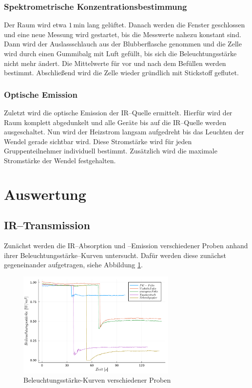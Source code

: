 \documentclass[12pt,a4paper]{scrartcl}
\numberwithin{equation}{section} %
\begin{document}
\subsubsection{Spektrometrische Konzentrationsbestimmung}
\label{howto:Spektrometrische Konzentrationsbestimmung}
Der Raum wird etwa $1\mathrm{\,min}$ lang gelüftet. Danach werden die Fenster geschlossen und eine neue Messung wird gestartet, bis die Messwerte nahezu konstant sind. Dann wird der Auslassschlauch aus der Blubberflasche genommen und die Zelle wird durch einen Gummibalg mit Luft gefüllt, bis sich die Beleuchtungsstärke nicht mehr ändert. Die Mittelwerte für vor und nach dem Befüllen werden bestimmt. Abschließend wird die Zelle wieder gründlich mit Stickstoff geflutet.

\subsubsection{Optische Emission}
\label{howto:Optische Emission}
Zuletzt wird die optische Emission der IR--Quelle ermittelt. Hierfür wird der Raum komplett abgedunkelt und alle Geräte bis auf die IR--Quelle werden ausgeschaltet. Nun wird der Heizstrom langsam aufgedreht bis das Leuchten der Wendel gerade sichtbar wird. Diese Stromstärke wird für jeden Gruppenteilnehmer individuell bestimmt. Zusätzlich wird die maximale Stromstärke der Wendel festgehalten.

\clearpage
\hypertarget{auswertung}{%
\section{Auswertung}\label{auswertung}}
\subsection{IR--Transmission}
\label{IR--Transmission}

Zunächst werden die IR--Absorption und --Emission verschiedener Proben anhand ihrer Beleuchtungsstärke--Kurven untersucht. Dafür werden diese zunächst gegeneinander aufgetragen, siehe Abbildung \ref{abb:materialien}.

\begin{figure}[h]
	\centering
	\includegraphics[width=0.7\textwidth]{../media/B1.1/materialien.pdf}
	\caption{Beleuchtungsstärke-Kurven verschiedener Proben}
	\label{abb:materialien}
\end{figure}
\end{document}
